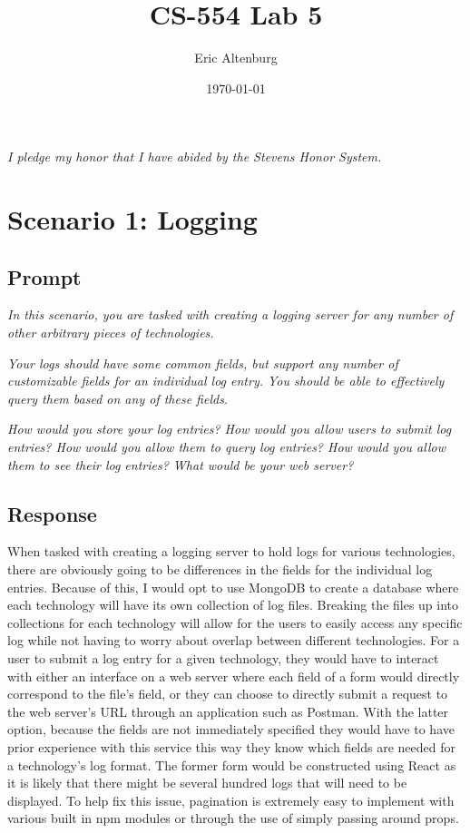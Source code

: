 \documentclass[11pt]{article}
\title{CS-554 Lab 5}
\author{Eric Altenburg}
\date{\today}
\begin{document}
	\maketitle


	\begin{center}
		\textit{I pledge my honor that I have abided by the Stevens Honor System.}
	\end{center}


	\section*{Scenario 1: Logging}
	\subsection*{Prompt}
	\textit{In this scenario, you are tasked with creating a logging server for any number of other arbitrary pieces of technologies.}

	\textit{Your logs should have some common fields, but support any number of customizable fields for an individual log entry. You should be able to effectively query them based on any of these fields.}

	\textit{How would you store your log entries? How would you allow users to submit log entries? How would you allow them to query log entries? How would you allow them to see their log entries? What would be your web server?}

	\subsection*{Response}
	When tasked with creating a logging server to hold logs for various technologies, there are obviously going to be differences in the fields for the individual log entries. Because of this, I would opt to use MongoDB to create a database where each technology will have its own collection of log files. Breaking the files up into collections for each technology will allow for the users to easily access any specific log while not having to worry about overlap between different technologies. For a user to submit a log entry for a given technology, they would have to interact with either an interface on a web server where each field of a form would directly correspond to the file's field, or they can choose to directly submit a request to the web server's URL through an application such as Postman. With the latter option, because the fields are not immediately specified they would have to have prior experience with this service this way they know which fields are needed for a technology's log format. The former form would be constructed using React as it is likely that there might be several hundred logs that will need to be displayed. To help fix this issue, pagination is extremely easy to implement with various built in npm modules or through the use of simply passing around props.
\end{document}

